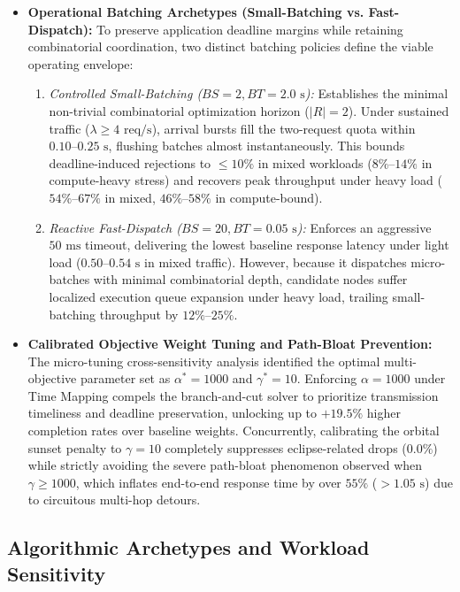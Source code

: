 \begin{itemize}
    \item \textbf{Operational Batching Archetypes (Small-Batching vs. Fast-Dispatch):} 
    To preserve application deadline margins while retaining combinatorial coordination, two distinct batching policies define the viable operating envelope:
    \begin{enumerate}
        \item \textit{Controlled Small-Batching ($BS=2, BT=2.0\text{ s}$):} Establishes the minimal non-trivial combinatorial optimization horizon ($|R|=2$). Under sustained traffic ($\lambda \ge 4\text{ req/s}$), arrival bursts fill the two-request quota within $0.10\text{--}0.25\text{ s}$, flushing batches almost instantaneously. This bounds deadline-induced rejections to $\le 10\%$ in mixed workloads ($8\%\text{--}14\%$ in compute-heavy stress) and recovers peak throughput under heavy load ($54\%\text{--}67\%$ in mixed, $46\%\text{--}58\%$ in compute-bound).
        \item \textit{Reactive Fast-Dispatch ($BS=20, BT=0.05\text{ s}$):} Enforces an aggressive $50\text{ ms}$ timeout, delivering the lowest baseline response latency under light load ($0.50\text{--}0.54\text{ s}$ in mixed traffic). However, because it dispatches micro-batches with minimal combinatorial depth, candidate nodes suffer localized execution queue expansion under heavy load, trailing small-batching throughput by $12\%\text{--}25\%$.
    \end{enumerate}

    \item \textbf{Calibrated Objective Weight Tuning and Path-Bloat Prevention:} 
    The micro-tuning cross-sensitivity analysis identified the optimal multi-objective parameter set as $\alpha^* = 1000$ and $\gamma^* = 10$. Enforcing $\alpha = 1000$ under Time Mapping compels the branch-and-cut solver to prioritize transmission timeliness and deadline preservation, unlocking up to $+19.5\%$ higher completion rates over baseline weights. Concurrently, calibrating the orbital sunset penalty to $\gamma = 10$ completely suppresses eclipse-related drops ($0.0\%$) while strictly avoiding the severe path-bloat phenomenon observed when $\gamma \ge 1000$, which inflates end-to-end response time by over $55\%$ ($> 1.05\text{ s}$) due to circuitous multi-hop detours.
\end{itemize}

\subsection{Algorithmic Archetypes and Workload Sensitivity}
\label{subsec:concl_workload_sensitivity}

